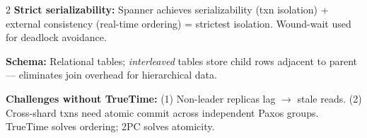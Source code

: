 \documentclass[9pt]{article}
\begin{document}
\begin{multicols*}{2}
\textbf{Strict serializability:} Spanner achieves serializability (txn isolation) + external consistency (real-time ordering) = strictest isolation. Wound-wait used for deadlock avoidance.

\textbf{Schema:} Relational tables; \emph{interleaved} tables store child rows adjacent to parent — eliminates join overhead for hierarchical data.

\textbf{Challenges without TrueTime:} (1) Non-leader replicas lag $\to$ stale reads. (2) Cross-shard txns need atomic commit across independent Paxos groups. TrueTime solves ordering; 2PC solves atomicity.

\end{multicols*}
\end{document}
